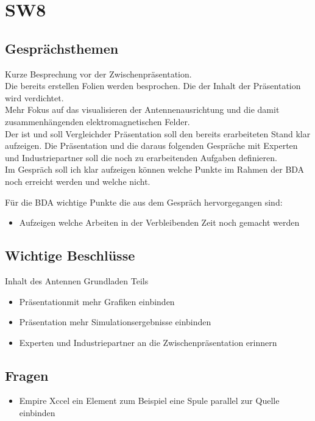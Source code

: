 \documentclass[10pt,a4paper]{article}
\begin{document}
\section*{SW8}

\subsection*{Gesprächsthemen}

Kurze Besprechung vor der Zwischenpräsentation.\\
Die bereits erstellen Folien werden besprochen. Die der Inhalt der Präsentation wird verdichtet.\\
Mehr Fokus auf das visualisieren der Antennenausrichtung und die damit zusammenhängenden elektromagnetischen Felder.\\
Der \glqq ist und soll Vergleich\grqq  der Präsentation soll den bereits erarbeiteten Stand klar aufzeigen. Die Präsentation und die daraus folgenden Gespräche mit Experten und Industriepartner soll die noch zu erarbeitenden Aufgaben definieren.\\
Im Gespräch soll ich klar aufzeigen können welche Punkte im Rahmen der BDA noch erreicht werden und welche nicht.


\vspace{10 mm}
Für die BDA wichtige Punkte die aus dem Gespräch hervorgegangen sind:
\begin{itemize}
	\item Aufzeigen welche Arbeiten   in der Verbleibenden Zeit noch gemacht werden
\end{itemize}

\subsection*{Wichtige Beschlüsse}
Inhalt des Antennen Grundladen Teils
\begin{itemize}
	\item Präsentationmit mehr Grafiken einbinden
	\item Präsentation mehr Simulationsergebnisse einbinden
	\item Experten und Industriepartner an die Zwischenpräsentation erinnern
\end{itemize}
\subsection*{Fragen}
\begin{itemize}
	\item Empire Xccel ein Element zum Beispiel eine Spule parallel zur Quelle einbinden
\end{itemize}
\end{document}
